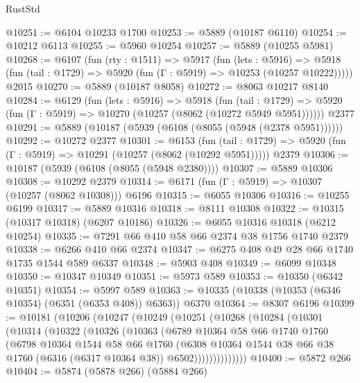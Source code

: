 \begin{lexlean}{RustStd}
\begin{coremodule}
@10251 := @6104 @10233 @1700
@10253 := @5889 (@10187 @6110)
@10254 := @10212 @6113
@10255 := @5960 @10254
@10257 := @5889 (@10255 @5981)
@10268 := @6107
    (fun (rty : @1511) =>
    @5917
      (fun (lets : @5916) =>
      @5918 (fun (tail : @1729) => @5920 (fun (Γ : @5919) => @10253 (@10257 @10222)))))
    @2015
@10270 := @5889 (@10187 @8058)
@10272 := @8063 @10217 @8140
@10284 := @6129
    (fun (lets : @5916) =>
    @5918
      (fun (tail : @1729) =>
      @5920 (fun (Γ : @5919) => @10270 (@10257 (@8062 (@10272 @5949 @5951))))))
    @2377
@10291 := @5889 (@10187 (@5939 (@6108 (@8055 (@5948 (@2378 @5951))))))
@10292 := @10272 @2377
@10301 := @6153
    (fun (tail : @1729) => @5920 (fun (Γ : @5919) => @10291 (@10257 (@8062 (@10292 @5951)))))
    @2379
@10306 := @10187 (@5939 (@6108 (@8055 (@5948 @2380))))
@10307 := @5889 @10306
@10308 := @10292 @2379
@10314 := @6171 (fun (Γ : @5919) => @10307 (@10257 (@8062 @10308))) @6196
@10315 := @6055 @10306
@10316 := @10255 @6199
@10317 := @5889 @10316
@10318 := @8111 @10308
@10322 := @10315 (@10317 @10318) (@6207 @10186)
@10326 := @6055 @10316 @10318 (@6212 @10254)
@10335 := @7291 @66 @410 @58 @66 @2374 @38 @1756 @1740 @2379
@10338 := @6266 @410 @66 @2374
@10347 := @6275 @408 @49 @28 @66 @1740 @1735 @1544 @589 @6337
@10348 := @5903 @408
@10349 := @6099 @10348
@10350 := @10347 @10349
@10351 := @5973 @589
@10353 := @10350 (@6342 @10351)
@10354 := @5997 @589
@10363 := @10335 (@10338 (@10353 (@6346 @10354) (@6351 (@6353 @408)) @6363)) @6370
@10364 := @8307 @6196
@10399 := @10181
    (@10206
      (@10247
        (@10249
          (@10251
            (@10268
              (@10284
                (@10301
                  (@10314
                    (@10322
                      (@10326
                        (@10363
                          (@6789
                            @10364
                            @58
                            @66
                            @1740
                            @1760
                            (@6798
                              @10364
                              @1544
                              @58
                              @66
                              @1760
                              (@6308
                                @10364
                                @1544
                                @38
                                @66
                                @38
                                @1760
                                (@6316 (@6317 @10364 @38))
                                @6502))))))))))))))
@10400 := @5872 @266
@10404 := @5874 (@5878 @266) (@5884 @266)

\end{coremodule}
\end{lexlean}
